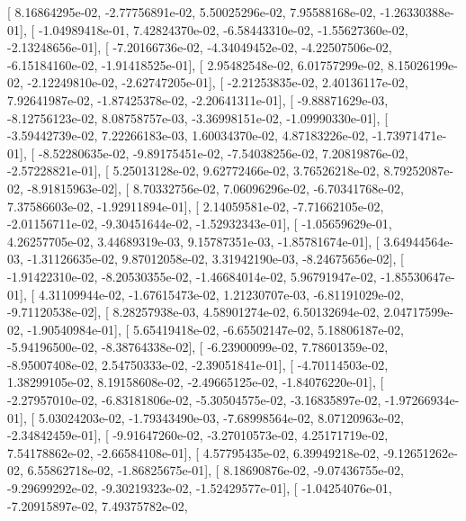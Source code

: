 \documentclass{article}
\begin{document}
       [  8.16864295e-02,  -2.77756891e-02,   5.50025296e-02,
          7.95588168e-02,  -1.26330388e-01],
       [ -1.04989418e-01,   7.42824370e-02,  -6.58443310e-02,
         -1.55627360e-02,  -2.13248656e-01],
       [ -7.20166736e-02,  -4.34049452e-02,  -4.22507506e-02,
         -6.15184160e-02,  -1.91418525e-01],
       [  2.95482548e-02,   6.01757299e-02,   8.15026199e-02,
         -2.12249810e-02,  -2.62747205e-01],
       [ -2.21253835e-02,   2.40136117e-02,   7.92641987e-02,
         -1.87425378e-02,  -2.20641311e-01],
       [ -9.88871629e-03,  -8.12756123e-02,   8.08758757e-03,
         -3.36998151e-02,  -1.09990330e-01],
       [ -3.59442739e-02,   7.22266183e-03,   1.60034370e-02,
          4.87183226e-02,  -1.73971471e-01],
       [ -8.52280635e-02,  -9.89175451e-02,  -7.54038256e-02,
          7.20819876e-02,  -2.57228821e-01],
       [  5.25013128e-02,   9.62772466e-02,   3.76526218e-02,
          8.79252087e-02,  -8.91815963e-02],
       [  8.70332756e-02,   7.06096296e-02,  -6.70341768e-02,
          7.37586603e-02,  -1.92911894e-01],
       [  2.14059581e-02,  -7.71662105e-02,  -2.01156711e-02,
         -9.30451644e-02,  -1.52932343e-01],
       [ -1.05659629e-01,   4.26257705e-02,   3.44689319e-03,
          9.15787351e-03,  -1.85781674e-01],
       [  3.64944564e-03,  -1.31126635e-02,   9.87012058e-02,
          3.31942190e-03,  -8.24675656e-02],
       [ -1.91422310e-02,  -8.20530355e-02,  -1.46684014e-02,
          5.96791947e-02,  -1.85530647e-01],
       [  4.31109944e-02,  -1.67615473e-02,   1.21230707e-03,
         -6.81191029e-02,  -9.71120538e-02],
       [  8.28257938e-03,   4.58901274e-02,   6.50132694e-02,
          2.04717599e-02,  -1.90540984e-01],
       [  5.65419418e-02,  -6.65502147e-02,   5.18806187e-02,
         -5.94196500e-02,  -8.38764338e-02],
       [ -6.23900099e-02,   7.78601359e-02,  -8.95007408e-02,
          2.54750333e-02,  -2.39051841e-01],
       [ -4.70114503e-02,   1.38299105e-02,   8.19158608e-02,
         -2.49665125e-02,  -1.84076220e-01],
       [ -2.27957010e-02,  -6.83181806e-02,  -5.30504575e-02,
         -3.16835897e-02,  -1.97266934e-01],
       [  5.03024203e-02,  -1.79343490e-03,  -7.68998564e-02,
          8.07120963e-02,  -2.34842459e-01],
       [ -9.91647260e-02,  -3.27010573e-02,   4.25171719e-02,
          7.54178862e-02,  -2.66584108e-01],
       [  4.57795435e-02,   6.39949218e-02,  -9.12651262e-02,
          6.55862718e-02,  -1.86825675e-01],
       [  8.18690876e-02,  -9.07436755e-02,  -9.29699292e-02,
         -9.30219323e-02,  -1.52429577e-01],
       [ -1.04254076e-01,  -7.20915897e-02,   7.49375782e-02,
\end{document}
